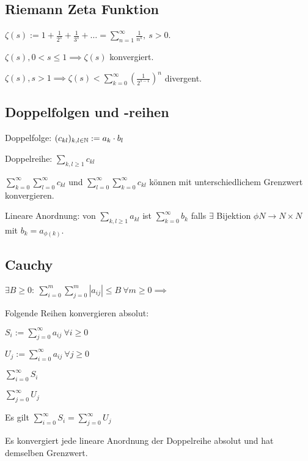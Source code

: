 \subsection{Riemann Zeta Funktion}
$\zeta(s) := 1 + \frac{1}{2^s} + \frac{1}{3^s} + \dots = \sum_{n=1}^{\infty} \frac{1}{n^s}, \ s > 0$.
\begin{compactitem}
    \item $\zeta(s), 0 < s \le 1 \implies \zeta(s)$ konvergiert.
    \item $\zeta(s), s > 1 \implies \zeta(s) < \sum_{k=0}^{\infty} \left( \frac{1}{2^{s-1}} \right)^n $ divergent.
\end{compactitem}

\subsection{Doppelfolgen und -reihen}
\begin{compactdesc}
    \item[Doppelfolge:] $(c_{kl})_{k,l \in \mathbb{N}} := a_k \cdot b_l$
    \item[Doppelreihe:] $\sum_{k,l\ge1} c_{kl}$
        \begin{compactitem}
            \item $\sum_{k=0}^{\infty} \sum_{l=0}^{\infty}c_{kl}$ und $\sum_{l=0}^{\infty} \sum_{k=0}^{\infty}c_{kl}$ können mit unterschiedlichem Grenzwert konvergieren.
        \end{compactitem}
    \item[Lineare Anordnung:] von $\sum_{k,l \ge 1} a_{kl}$ ist $\sum_{k=0}^{\infty} b_k$ falls $\exists$ Bijektion $\phi N \to N \times N$ mit $b_k = a_{\phi(k)}$.
\end{compactdesc}

\subsection{Cauchy}
$\exists B \ge 0: \ \sum_{i=0}^{m} \sum_{j=0}^{m} \left| a_{ij} \right| \le B \ \forall m \ge 0 \implies$
\begin{compactitem}
    \item Folgende Reihen konvergieren absolut:
        \begin{compactitem}
            \item $S_i := \sum_{j=0}^{\infty} a_{ij} \ \forall i \ge 0$
            \item $U_j := \sum_{i=0}^{\infty} a_{ij} \ \forall j \ge 0$
            \item $\sum_{i=0}^{\infty} S_i$
            \item $\sum_{j=0}^{\infty} U_j$
        \end{compactitem}
    \item Es gilt $\sum_{i=0}^{\infty} S_i = \sum_{j=0}^{\infty} U_j$
    \item Es konvergiert jede lineare Anordnung der Doppelreihe absolut und hat demselben Grenzwert.
\end{compactitem}

